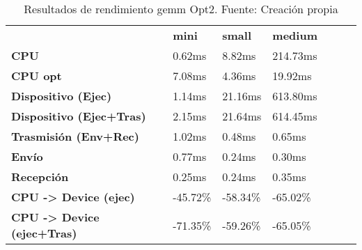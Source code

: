 \begin{table}[H]
    \centering
    \begin{tabular}{lllllll}
    \rowcolor[HTML]{DAE8FC} \ &  \textbf{mini} &  \textbf{	small} &  \textbf{	medium} \\
    \cellcolor[HTML]{DAE8FC} \textbf{CPU} & 0.62ms & 	8.82ms & 	214.73ms \\
    \rowcolor[HTML]{EFEFEF} \cellcolor[HTML]{DAE8FC} \textbf{CPU opt} & 7.08ms & 	4.36ms & 	19.92ms \\
    \cellcolor[HTML]{DAE8FC} \textbf{Dispositivo (Ejec)} & 1.14ms & 	21.16ms & 	613.80ms \\
    \rowcolor[HTML]{EFEFEF} \cellcolor[HTML]{DAE8FC} \textbf{Dispositivo (Ejec+Tras)} & 2.15ms & 	21.64ms & 	614.45ms \\
    \cellcolor[HTML]{DAE8FC} \textbf{Trasmisión (Env+Rec)} & 1.02ms & 	0.48ms & 	0.65ms \\
    \rowcolor[HTML]{EFEFEF} \cellcolor[HTML]{DAE8FC} \textbf{Envío} & 0.77ms & 	0.24ms & 	0.30ms \\
    \cellcolor[HTML]{DAE8FC} \textbf{Recepción} & 0.25ms & 	0.24ms & 	0.35ms \\
    \rowcolor[HTML]{EFEFEF} \cellcolor[HTML]{DAE8FC} \textbf{CPU -> Device (ejec)} & -45.72\% & 	-58.34\% & 	-65.02\% \\
    \cellcolor[HTML]{DAE8FC} \textbf{CPU -> Device (ejec+Tras)} & -71.35\% & 	-59.26\% & 	-65.05\% \\
    \end{tabular}
    \caption[Resultados de rendimiento gemm Opt2]{{Resultados de rendimiento gemm Opt2. Fuente: Creación propia}}
    \label{table_test_gemm_Opt2_hw_performanceResults}
\end{table}